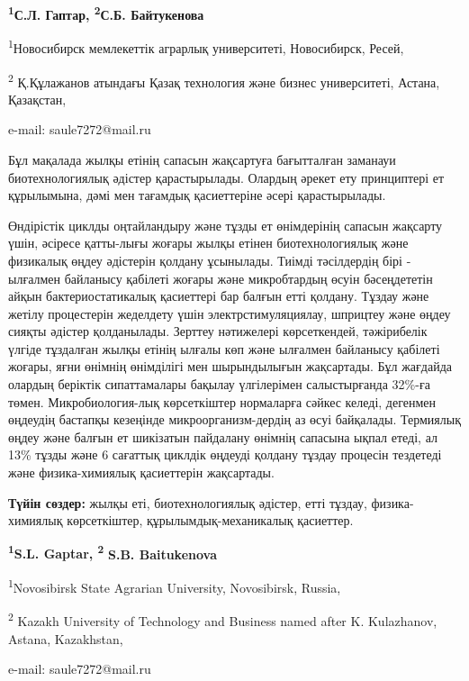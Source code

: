 \begin{center}

{\bfseries \textsuperscript{1}С.Л. Гаптар, \textsuperscript{2}С.Б.
Байтукенова\envelope}

\textsuperscript{1}Новосибирск мемлекеттік аграрлық университеті,
Новосибирск, Ресей,

\textsuperscript{2} Қ.Құлажанов атындағы Қазақ технология және бизнес
университеті, Астана, Қазақстан,

e-mail: saule7272@mail.ru
\end{center}

Бұл мақалада жылқы етінің сапасын жақсартуға бағытталған заманауи
биотехнологиялық әдістер қарастырылады. Олардың әрекет ету принциптері
ет құрылымына, дәмі мен тағамдық қасиеттеріне әсері қарастырылады.

Өндірістік циклды оңтайландыру және тұзды ет өнімдерінің сапасын
жақсарту үшін, әсіресе қатты-лығы жоғары жылқы етінен биотехнологиялық
және физикалық өңдеу әдістерін қолдану ұсынылады. Тиімді тәсілдердің
бірі - ылғалмен байланысу қабілеті жоғары және микробтардың өсуін
бәсеңдететін айқын бактериостатикалық қасиеттері бар балғын етті
қолдану. Тұздау және жетілу процестерін жеделдету үшін
электрстимуляциялау, шприцтеу және өңдеу сияқты әдістер қолданылады.
Зерттеу нәтижелері көрсеткендей, тәжірибелік үлгіде тұздалған жылқы
етінің ылғалы көп және ылғалмен байланысу қабілеті жоғары, яғни өнімнің
өнімділігі мен шырындылығын жақсартады. Бұл жағдайда олардың беріктік
сипаттамалары бақылау үлгілерімен салыстырғанда 32\%-ға төмен.
Микробиология-лық көрсеткіштер нормаларға сәйкес келеді, дегенмен
өңдеудің бастапқы кезеңінде микроорганизм-дердің аз өсуі байқалады.
Термиялық өңдеу және балғын ет шикізатын пайдалану өнімнің сапасына
ықпал етеді, ал 13\% тұзды және 6 сағаттық циклдік өңдеуді қолдану
тұздау процесін тездетеді және физика-химиялық қасиеттерін жақсартады.

{\bfseries Түйін сөздер:} жылқы еті, биотехнологиялық әдістер, етті тұздау,
физика-химиялық көрсеткіштер, құрылымдық-механикалық қасиеттер.

\begin{center}

{\bfseries \textsuperscript{1}S.L. Gaptar, \textsuperscript{2}}
{\bfseries S.B. Baitukenova\envelope}

\textsuperscript{1}Novosibirsk State Agrarian University, Novosibirsk,
Russia,

\textsuperscript{2} Kazakh University of Technology and Business named
after K. Kulazhanov, Astana, Kazakhstan,

e-mail: saule7272@mail.ru
\end{center}

